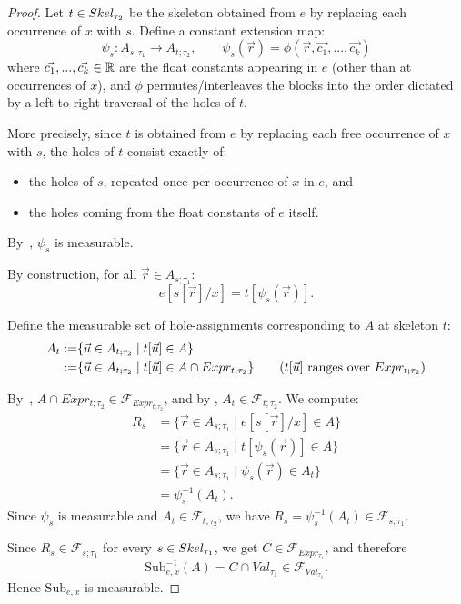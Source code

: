 \begin{proof}
    Let $t \in Skel_{\tau_2}$ be the skeleton obtained from $e$ by replacing each
    occurrence of $x$ with $s$. Define a constant extension map:
	\[
		\psi_s \colon A_{s;\tau_1} \to A_{t;\tau_2}, \qquad \psi_s(\vec{r}) = \phi(\vec{r}, \vec{c_1}, ..., \vec{c_k})
	\]
	where $\vec{c_1}, ..., \vec{c_k} \in \mathbb{R}$ are the float constants appearing in $e$ (other than at occurrences of $x$), and $\phi$ permutes/interleaves the blocks into the order dictated by a left-to-right traversal of the holes of $t$. 

	More precisely, since $t$ is obtained from $e$ by replacing each free occurrence of $x$ with $s$, the holes of $t$ consist exactly of:

	\begin{itemize}
		\item the holes of $s$, repeated once per occurrence of $x$ in $e$, and
		\item the holes coming from the float constants of $e$ itself.
	\end{itemize}
	
	By~, $\psi_s$ is measurable.

    By construction, for all $\vec{r} \in A_{s;\tau_1}$:
    \[
        e[s[\vec{r}]/x] = t[\psi_s(\vec{r})].
    \]

    Define the measurable set of hole-assignments corresponding to $A$ at skeleton $t$:
    \begin{align*}
		A_t := &\{\vec{u} \in A_{t;\tau_2} \mid t[\vec{u}] \in A\} \\
		:= &\{\vec{u} \in A_{t;\tau_2} \mid t[\vec{u}] \in A \cap Expr_{t;\tau_2}\} 
        \tag{$t[\vec{u}]$ ranges over $Expr_{t;\tau_2}$}
	\end{align*}

	    By~, $A \cap Expr_{t;\tau_2} \in \mathcal{F}_{Expr_{t;\tau_2}}$, and by , $A_t \in \mathcal{F}_{t;\tau_2}$. We compute:
    \begin{align*}
        R_s
        &= \{\vec{r} \in A_{s;\tau_1} \mid e[s[\vec{r}]/x] \in A\} \\
        &= \{\vec{r} \in A_{s;\tau_1} \mid t[\psi_s(\vec{r})] \in A\} \\
        &= \{\vec{r} \in A_{s;\tau_1} \mid \psi_s(\vec{r}) \in A_t\} \\
        &= \psi_s^{-1}(A_t).
    \end{align*}
    Since $\psi_s$ is measurable and $A_t \in \mathcal{F}_{t;\tau_2}$, we have
    $R_s = \psi_s^{-1}(A_t) \in \mathcal{F}_{s;\tau_1}$.

    Since $R_s \in \mathcal{F}_{s;\tau_1}$ for every $s \in Skel_{\tau_1}$, we get
    $C \in \mathcal{F}_{Expr_{\tau_1}}$, and therefore
    \[
        \mathrm{Sub}_{e,x}^{-1}(A) = C \cap Val_{\tau_1} \in \mathcal{F}_{Val_{\tau_1}}.
    \]
    Hence $\mathrm{Sub}_{e,x}$ is measurable.
\end{proof}

